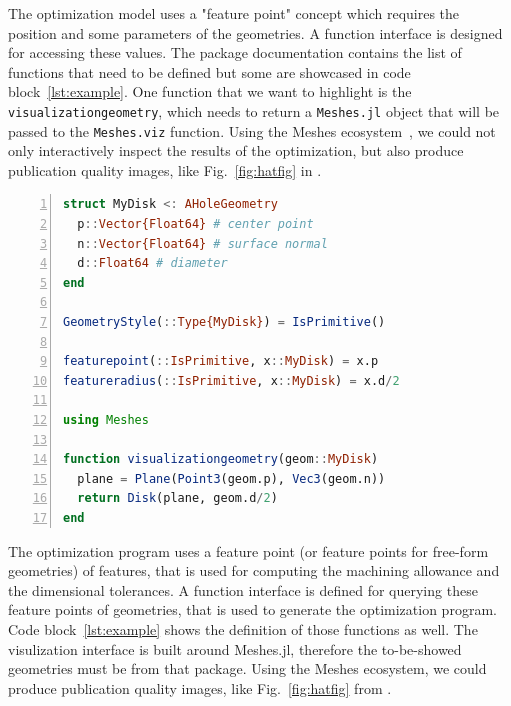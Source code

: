\documentclass{juliacon}
\begin{document}
The optimization model uses a "feature point" concept which requires the position and some parameters of the geometries.
A function interface is designed for accessing these values.
The package documentation contains the list of functions that need to be defined but some are showcased in code block~\ref{lst:example}.
One function that we want to highlight is the \texttt{visualizationgeometry}, which needs to return a \texttt{Meshes.jl} object that will be passed to the \texttt{Meshes.viz} function.
Using the Meshes ecosystem~\cite{Hoffimann2023}, we could not only interactively inspect the results of the optimization, but also produce publication quality images, like Fig.~\ref{fig:hatfig} in \cite{cserteg:2023_Annals}.

\vspace*{2em}

\begin{lstlisting}[language = Julia, numbers=left, label={lst:example}, caption={Defining a new type for the optimization model.}]
struct MyDisk <: AHoleGeometry
  p::Vector{Float64} # center point
  n::Vector{Float64} # surface normal
  d::Float64 # diameter
end

GeometryStyle(::Type{MyDisk}) = IsPrimitive()

featurepoint(::IsPrimitive, x::MyDisk) = x.p
featureradius(::IsPrimitive, x::MyDisk) = x.d/2

using Meshes

function visualizationgeometry(geom::MyDisk)
  plane = Plane(Point3(geom.p), Vec3(geom.n))
  return Disk(plane, geom.d/2)
end
\end{lstlisting}


\iffalse
The optimization program uses a feature point (or feature points for free-form geometries) of features, that is used for computing the machining allowance and the dimensional tolerances.
A function interface is defined for querying these feature points of geometries, that is used to generate the optimization program.
Code block~\ref{lst:example} shows the definition of those functions as well.
The visulization interface is built around Meshes.jl, therefore the to-be-showed geometries must be from that package.
Using the Meshes ecosystem, we could produce publication quality images, like Fig.~\ref{fig:hatfig} from \cite{cserteg:2023_Annals}.
\end{document}
